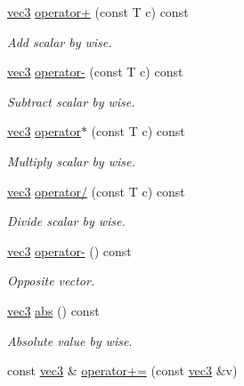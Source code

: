 \begin{DoxyCompactItemize}
\mbox{\hyperlink{struct_space_h_1_1vec3}{vec3}} \mbox{\hyperlink{struct_space_h_1_1vec3_a9271a40ff2a3d64a97f37e53fb668d07}{operator+}} (const T c) const
\begin{DoxyCompactList}\small\item\em Add scalar by wise. \end{DoxyCompactList}\item 
\mbox{\hyperlink{struct_space_h_1_1vec3}{vec3}} \mbox{\hyperlink{struct_space_h_1_1vec3_a05e464381d8e6757e6604fd42a62fec6}{operator-\/}} (const T c) const
\begin{DoxyCompactList}\small\item\em Subtract scalar by wise. \end{DoxyCompactList}\item 
\mbox{\hyperlink{struct_space_h_1_1vec3}{vec3}} \mbox{\hyperlink{struct_space_h_1_1vec3_adb9a23774fc263d23487bdc6d2e253ce}{operator$\ast$}} (const T c) const
\begin{DoxyCompactList}\small\item\em Multiply scalar by wise. \end{DoxyCompactList}\item 
\mbox{\hyperlink{struct_space_h_1_1vec3}{vec3}} \mbox{\hyperlink{struct_space_h_1_1vec3_af3f90f3a0f92d6ee7bd8b413b14d2aaf}{operator/}} (const T c) const
\begin{DoxyCompactList}\small\item\em Divide scalar by wise. \end{DoxyCompactList}\item 
\mbox{\hyperlink{struct_space_h_1_1vec3}{vec3}} \mbox{\hyperlink{struct_space_h_1_1vec3_a74db760e195c089b32b5319e9d45028e}{operator-\/}} () const
\begin{DoxyCompactList}\small\item\em Opposite vector. \end{DoxyCompactList}\item 
\mbox{\hyperlink{struct_space_h_1_1vec3}{vec3}} \mbox{\hyperlink{struct_space_h_1_1vec3_af82905f49546b9aa03799dcd87bdff0c}{abs}} () const
\begin{DoxyCompactList}\small\item\em Absolute value by wise. \end{DoxyCompactList}\item 
const \mbox{\hyperlink{struct_space_h_1_1vec3}{vec3}} \& \mbox{\hyperlink{struct_space_h_1_1vec3_a5a9143627e21c4b343b4ac44a5759cc8}{operator+=}} (const \mbox{\hyperlink{struct_space_h_1_1vec3}{vec3}} \&v)
\item 

\end{DoxyCompactItemize}
